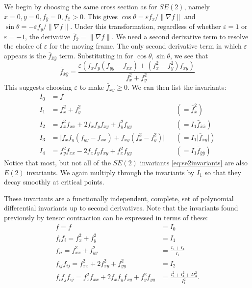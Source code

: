 \documentclass[review,onefignum,onetabnum]{siamonline190516}
\begin{document}
{We begin by choosing the same cross section as for $SE(2)$, namely $\bar{x} = 0,
\bar{y} = 0, \bar{f}_{\bar{y}} = 0, \bar{f}_{\bar{x}} > 0$. This gives
$\cos\theta = \varepsilon f_x / \lVert \nabla f \rVert$ and $\sin\theta =
-\varepsilon f_y / \lVert \nabla f \rVert$. Under this transformation,
regardless of whether $\varepsilon = 1$ or $\varepsilon = -1$, the
derivative $\bar{f}_{\bar{x}} = \lVert \nabla f \rVert$. We need a second
derivative term to resolve the choice of $\varepsilon$ for the moving
frame. The only second derivative term in which $\varepsilon$ appears is
the $\bar{f}_{\bar{x}\bar{y}}$ term. Substituting in for $\cos\theta,
\sin\theta$, we see that
\begin{equation*}
    \bar{f}_{\bar{x}\bar{y}} = \frac{\varepsilon(f_xf_y(f_{yy} - f_{xx}) + (f_x^2 -
    f_y^2)f_{xy})}{f_x^2 + f_y^2}
\end{equation*}
This suggests choosing $\varepsilon$ to make $\bar{f}_{\bar{x}\bar{y}} \ge
0$. We can then list the invariants:
\begin{equation}\label{eq:e2invariants}
\begin{aligned}
  I_0 &= f \\
  I_1 &= f_x^2 + f_y^2 & &(= \bar{f}_{\bar{x}}^2)\\
  I_2 &= f_x^2 f_{xx} + 2 f_x f_y f_{xy} + f_y^2 f_{yy} &&(= I_1\bar{f}_{\bar{x}\bar{x}}) \\
  I_3 &= \lvert f_x f_y (f_{yy} - f_{xx}) + f_{xy} (f_x^2 - f_y^2)\rvert
  &&(= I_1\lvert \bar{f}_{\bar{x}\bar{y}}\rvert)\\
  I_4 &= f_y^2 f_{xx} - 2 f_x f_y f_{xy} + f_x^2 f_{yy} &&(= I_1\bar{f}_{\bar{y}\bar{y}})
\end{aligned}
\end{equation}
Notice that most, but not all of the $SE(2)$ invariants
\eqref{eq:se2invariants} are also $E(2)$ invariants. We again multiply
through the invariants by $I_1$ so that they decay smoothly at critical
points.

These invariants are a functionally independent, complete, set of polynomial differential invariants up to second derivatives. Note that the invariants found previously by tensor contraction can be expressed in terms of these:
\begin{align*}
  f = f &= I_0 \\
  f_if_i = f_x^2 + f_y^2 &= I_1 \\
  f_{ii} = f_{xx}^2 + f_{yy}^2 &= \frac{I_2 + I_4}{I_1} \\
  f_{ij} f_{ij} = f_{xx}^2 + 2f_{xy}^2 + f_{yy}^2 &= I_2\\
  f_i f_j f_{ij} = f_x^2 f_{xx} + 2f_x f_y f_{xy} + f_y^2 f_{yy} &= \frac{I_2^2 + I_4^2 + 2I_3^2}{I_1^2}.
\end{align*}

}
\end{document}
